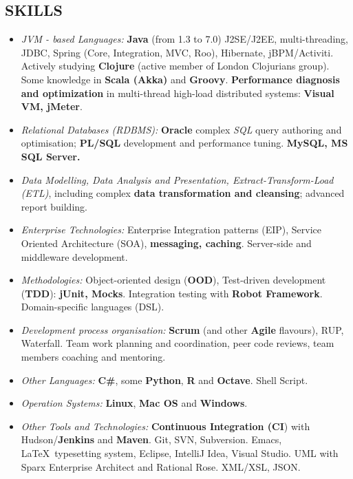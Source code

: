 \documentclass{res}
\newif\ifFullVersion
\begin{document}
\begin{resume}
\section{SKILLS}
\begin{itemize}
\ifFullVersion
  \item {\em Full software development lifecycle (SLDC):} requirement gathering and analysis, design, prototyping, implementation, performance tuning, quality assurance (QA) organisation, release management.
  \item {\em Development process organisation:} {\bf Scrum} (and other {\bf Agile} flavours), RUP, Waterfall. Team work planning and coordination, peer code reviews, team members coaching and mentoring.
\fi
  \item {\em JVM - based Languages:} {\bf Java} (from 1.3 to 7.0) J2SE/J2EE, multi-threading, JDBC, Spring (Core, Integration, MVC, Roo), Hibernate, jBPM/Activiti. Actively studying {\bf Clojure} (active member of London Clojurians group). Some knowledge in {\bf Scala (Akka)} and {\bf Groovy}. {\bf Performance diagnosis and optimization} in multi-thread high-load distributed systems: {\bf Visual VM, jMeter}.
  \item {\em Relational Databases (RDBMS):} {\bf Oracle} complex {\em SQL} query authoring and optimisation; {\bf PL/SQL} development and performance tuning. {\bf MySQL, MS SQL Server.}
  \item {\em Data Modelling, Data Analysis and Presentation, Extract-Transform-Load (ETL)}, including complex {\bf data transformation and cleansing}; advanced report building.
  \item {\em Enterprise Technologies:} Enterprise Integration patterns (EIP), Service Oriented Architecture (SOA), {\bf messaging, caching}. Server-side and middleware development.
  \item {\em Methodologies:} Object-oriented design ({\bf OOD}), Test-driven development ({\bf TDD}): {\bf jUnit, Mocks}. Integration testing with {\bf Robot Framework}. Domain-specific languages (DSL).
\ifFullVersion
Strong interest in {\bf functional programming}, Data Science and Machine Learning / Business Intelligence systems.
\else
  \item {\em Development process organisation:} {\bf Scrum} (and other {\bf Agile} flavours), RUP, Waterfall. Team work planning and coordination, peer code reviews, team members coaching and mentoring.
\fi
  \item {\em Other Languages:} {\bf C\#}, some {\bf Python}, {\bf R} and {\bf Octave}. Shell Script.
  \item {\em Operation Systems:} {\bf Linux}, {\bf Mac OS} and {\bf Windows}.
  \item {\em Other Tools and Technologies:} {\bf Continuous Integration (CI}) with Hudson/{\bf Jenkins} and {\bf Maven}. Git, SVN, Subversion. Emacs, \LaTeX ~typesetting system, Eclipse, IntelliJ Idea, Visual Studio. UML with Sparx Enterprise Architect and Rational Rose. XML/XSL, JSON.
\end{itemize}


\end{resume}
\end{document}
